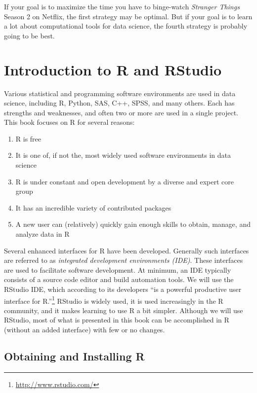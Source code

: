 \documentclass[]{krantz}
\providecommand{\tightlist}{%
  \setlength{\itemsep}{0pt}\setlength{\parskip}{0pt}}
\begin{document}
If your goal is to maximize the time you have to binge-watch
\emph{Stranger Things} Season 2 on Netflix, the first strategy may be
optimal. But if your goal is to learn a lot about computational tools
for data science, the fourth strategy is probably going to be best.

\chapter{Introduction to R and
RStudio}\label{introduction-to-r-and-rstudio}

Various statistical and programming software environments are used in
data science, including R, Python, SAS, C++, SPSS, and many others. Each
has strengths and weaknesses, and often two or more are used in a single
project. This book focuses on R for several reasons:

\begin{enumerate}
\def\labelenumi{\arabic{enumi}.}
\tightlist
\item
  R is free
\item
  It is one of, if not the, most widely used software environments in
  data science
\item
  R is under constant and open development by a diverse and expert core
  group
\item
  It has an incredible variety of contributed packages
\item
  A new user can (relatively) quickly gain enough skills to obtain,
  manage, and analyze data in R
\end{enumerate}

Several enhanced interfaces for R have been developed. Generally such
interfaces are referred to as \emph{integrated development environments
(IDE)}. These interfaces are used to facilitate software development. At
minimum, an IDE typically consists of a source code editor and build
automation tools. We will use the RStudio IDE, which according to its
developers ``is a powerful productive user interface for R.''\footnote{\url{http://www.rstudio.com/}}
RStudio is widely used, it is used increasingly in the R community, and
it makes learning to use R a bit simpler. Although we will use RStudio,
most of what is presented in this book can be accomplished in R (without
an added interface) with few or no changes.

\section{Obtaining and Installing R}\label{obtaining-and-installing-r}
\end{document}

